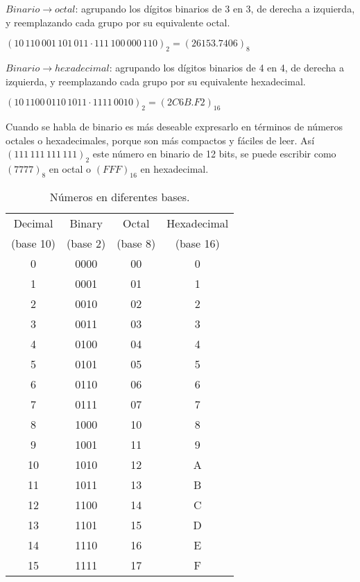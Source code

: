 \documentclass{article}
\begin{document}
$Binario \rightarrow octal$: agrupando los d\'{i}gitos binarios de 3 en 3,
de derecha a izquierda, y reemplazando cada grupo por su equivalente octal.
\begin{center}
    \large
    $(10\,110\,001\,101\,011 \cdot 111\,100\,000\,110)_2 = (26153.7406)_8$
\end{center}

$Binario \rightarrow hexadecimal$: agrupando los d\'{i}gitos binarios de 4 en 4,
de derecha a izquierda, y reemplazando cada grupo por su equivalente hexadecimal.
\begin{center}
    \large
    $(10\,1100\,0110\,1011 \cdot 1111\,0010)_2 = (2C6B.F2)_{16}$
\end{center}

Cuando se habla de binario es m\'{a}s deseable expresarlo en t\'{e}rminos de
n\'{u}meros octales o hexadecimales, porque son m\'{a}s compactos y f\'{a}ciles
de leer. As\'{i} $(111\,111\,111\,111)_2$ este n\'{u}mero en binario de 12 bits,
se puede escribir como $(7777)_8$ en octal o $(FFF)_{16}$ en hexadecimal.

\medskip

\begin{table}[h]
    \centering
    \begin{tabular}{cccc}
        \toprule
        Decimal & Binary & Octal & Hexadecimal \\
        (base 10) & (base 2) & (base 8) & (base 16) \\
        \midrule
        0 & 0000 & 00 & 0 \\
        1 & 0001 & 01 & 1 \\
        2 & 0010 & 02 & 2 \\
        3 & 0011 & 03 & 3 \\
        4 & 0100 & 04 & 4 \\
        5 & 0101 & 05 & 5 \\
        6 & 0110 & 06 & 6 \\
        7 & 0111 & 07 & 7 \\
        8 & 1000 & 10 & 8 \\
        9 & 1001 & 11 & 9 \\
        10 & 1010 & 12 & A \\
        11 & 1011 & 13 & B \\
        12 & 1100 & 14 & C \\
        13 & 1101 & 15 & D \\
        14 & 1110 & 16 & E \\
        15 & 1111 & 17 & F \\
        \bottomrule
    \end{tabular}
    \caption{N\'{u}meros en diferentes bases.}
    \label{tab:numbers}
\end{table}
\end{document}
